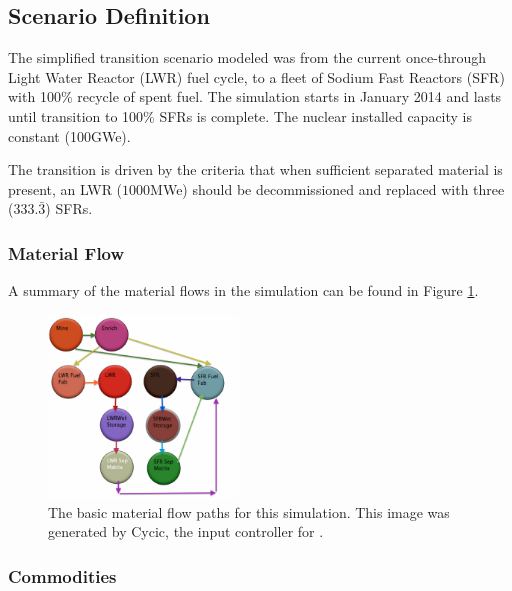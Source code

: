 \subsection{Scenario Definition}
The simplified transition scenario modeled was from the current once-through
Light Water Reactor (LWR) fuel cycle, to a fleet of Sodium Fast Reactors (SFR)
with 100\% recycle of spent fuel.  The simulation starts in January 2014 and
lasts until transition to 100\% SFRs is complete. The nuclear installed
capacity is constant (100GWe).

The transition is driven by the criteria that when sufficient separated
material is present, an LWR ($1000$MWe) should be decommissioned and replaced
with three ($333.\bar{3}$) SFRs.

\subsubsection{Material Flow}
A summary of the material flows in the simulation can be found in Figure 
\ref{fig:cycic_img}. 

\begin{figure}[htpb!]
\begin{center}
\includegraphics[width=0.45\textwidth]{cycic_img.eps}
\end{center}
\caption{The basic material flow paths for this simulation. This image was 
generated by Cycic, the input controller for \Cyclus 
\cite{flanagan_input_2013}.}
\label{fig:cycic_img}
\end{figure}
\subsubsection{Commodities}

